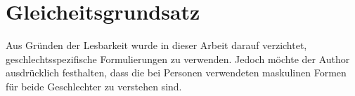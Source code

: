 
\chapter*{Gleicheitsgrundsatz}
Aus Gründen der Lesbarkeit wurde in dieser Arbeit darauf verzichtet, geschlechtsspezifische Formulierungen zu verwenden. Jedoch möchte der Author ausdrücklich
festhalten, dass die bei Personen verwendeten maskulinen Formen für beide Geschlechter zu verstehen sind.\\
